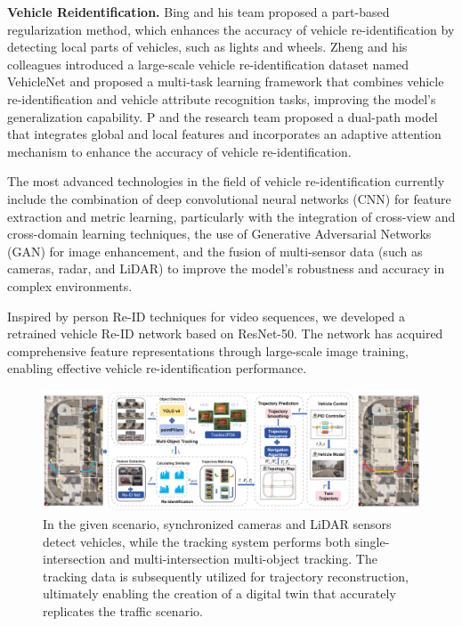 \documentclass[lettersize,journal]{IEEEtran}
\begin{document}
\textbf{Vehicle Reidentification.}
Bing and his team proposed a part-based regularization method, which enhances the accuracy of vehicle re-identification by detecting local parts of vehicles, such as lights and wheels\cite{Alpher19b}. 
Zheng and his colleagues introduced a large-scale vehicle re-identification dataset named VehicleNet and proposed a multi-task learning framework that combines vehicle re-identification and vehicle attribute recognition tasks, improving the model's generalization capability\cite{Alpher20f}. 
P and the research team proposed a dual-path model that integrates global and local features and incorporates an adaptive attention mechanism to enhance the accuracy of vehicle re-identification\cite{Alpher19c}.

The most advanced technologies in the field of vehicle re-identification currently include the combination of deep convolutional neural networks (CNN) for feature extraction and metric learning\cite{Alpher20g}, particularly with the integration of cross-view and cross-domain learning techniques, the use of Generative Adversarial Networks (GAN) for image enhancement\cite{Alpher21d}, and the fusion of multi-sensor data (such as cameras, radar, and LiDAR) to improve the model's robustness and accuracy in complex environments\cite{Alpher22g}.

Inspired by person Re-ID techniques for video sequences, we developed a retrained vehicle Re-ID network based on ResNet-50. 
The network has acquired comprehensive feature representations through large-scale image training, enabling effective vehicle re-identification performance.

\begin{figure}[t]
	\centering
	\includegraphics[width=\textwidth]{picture/picture2.png} 
	\caption{In the given scenario, synchronized cameras and LiDAR sensors detect vehicles, while the tracking system performs both single-intersection and multi-intersection multi-object tracking. The tracking data is subsequently utilized for trajectory reconstruction, ultimately enabling the creation of a digital twin that accurately replicates the traffic scenario.}
	\label{fig:2}
\end{figure}
\end{document}
